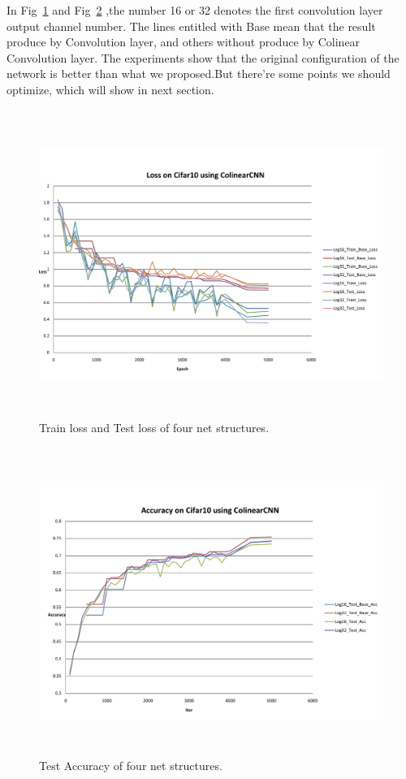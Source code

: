 \documentclass[12pt]{article}
\begin{document}
In Fig~\ref{fig:loss} and Fig~\ref{fig:acc} ,the number 16 or 32 denotes the first convolution layer output channel number. The lines entitled with Base mean that the result produce by Convolution layer, and others without produce by Colinear Convolution layer. The experiments show that the original configuration of the network is better than what we proposed.But there're some points we should optimize, which will show in next section.
\begin{figure}[!ht]
    \centering
    \includegraphics[height=10cm]{1.pdf}
    \caption{\label{fig:loss} Train loss and Test loss of four net structures.}
\end{figure}
\begin{figure}[!ht]
    \centering
    \includegraphics[height=10cm]{2.pdf}
    \caption{\label{fig:acc} Test Accuracy of four net structures.}
\end{figure}
\clearpage
\end{document}
